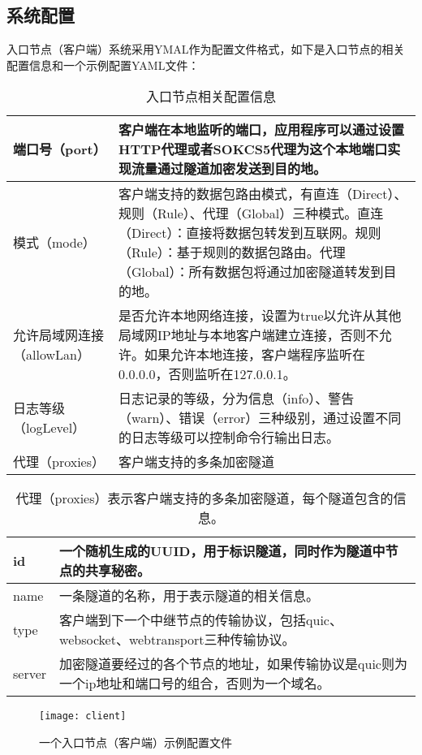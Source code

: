 \subsection{系统配置}
入口节点（客户端）系统采用YMAL作为配置文件格式，如下是入口节点的相关配置信息和一个示例配置YAML文件：
\begin{table}[H]
  \begin{tabular}{| m{10em} | m{24em} |}
  \hline
  端口号（port） & 客户端在本地监听的端口，应用程序可以通过设置HTTP代理或者SOKCS5代理为这个本地端口实现流量通过隧道加密发送到目的地。  \\ \hline
  模式（mode）  & 客户端支持的数据包路由模式，有直连（Direct）、规则（Rule）、代理（Global）三种模式。直连（Direct）：直接将数据包转发到互联网。规则（Rule）：基于规则的数据包路由。代理（Global）：所有数据包将通过加密隧道转发到目的地。\\ \hline            
  允许局域网连接（allowLan）  & 是否允许本地网络连接，设置为true以允许从其他局域网IP地址与本地客户端建立连接，否则不允许。如果允许本地连接，客户端程序监听在0.0.0.0，否则监听在127.0.0.1。 \\ \hline         
  日志等级（logLevel）  & 日志记录的等级，分为信息（info）、警告（warn）、错误（error）三种级别，通过设置不同的日志等级可以控制命令行输出日志。 \\ \hline    
  代理（proxies）  & 客户端支持的多条加密隧道 \\ \hline              
  \end{tabular}
  \caption{入口节点相关配置信息}
\end{table}

\begin{table}[H]
  \begin{tabular}{| m{10em} | m{22em} |}
  \hline
  id & 一个随机生成的UUID，用于标识隧道，同时作为隧道中节点的共享秘密。  \\ \hline
  name  & 一条隧道的名称，用于表示隧道的相关信息。 \\ \hline            
  type  & 客户端到下一个中继节点的传输协议，包括quic、websocket、webtransport三种传输协议。 \\ \hline    
  server  & 加密隧道要经过的各个节点的地址，如果传输协议是quic则为一个ip地址和端口号的组合，否则为一个域名。 \\ \hline              
  \end{tabular}
  \caption{代理（proxies）表示客户端支持的多条加密隧道，每个隧道包含的信息。}
\end{table}

\begin{figure}[H]
  \centering
  \texttt{[image: client]}
  \caption{一个入口节点（客户端）示例配置文件}
\end{figure}

